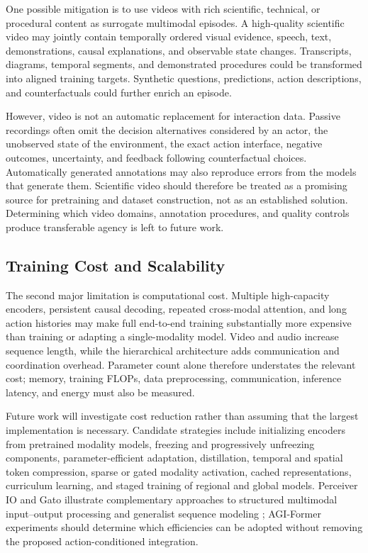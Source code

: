 One possible mitigation is to use videos with rich scientific, technical, or procedural content as surrogate multimodal episodes. A high-quality scientific video may jointly contain temporally ordered visual evidence, speech, text, demonstrations, causal explanations, and observable state changes. Transcripts, diagrams, temporal segments, and demonstrated procedures could be transformed into aligned training targets. Synthetic questions, predictions, action descriptions, and counterfactuals could further enrich an episode.

However, video is not an automatic replacement for interaction data. Passive recordings often omit the decision alternatives considered by an actor, the unobserved state of the environment, the exact action interface, negative outcomes, uncertainty, and feedback following counterfactual choices. Automatically generated annotations may also reproduce errors from the models that generate them. Scientific video should therefore be treated as a promising source for pretraining and dataset construction, not as an established solution. Determining which video domains, annotation procedures, and quality controls produce transferable agency is left to future work.

\subsection{\textbf{Training Cost and Scalability}}

The second major limitation is computational cost. Multiple high-capacity encoders, persistent causal decoding, repeated cross-modal attention, and long action histories may make full end-to-end training substantially more expensive than training or adapting a single-modality model. Video and audio increase sequence length, while the hierarchical architecture adds communication and coordination overhead. Parameter count alone therefore understates the relevant cost; memory, training FLOPs, data preprocessing, communication, inference latency, and energy must also be measured.

Future work will investigate cost reduction rather than assuming that the largest implementation is necessary. Candidate strategies include initializing encoders from pretrained modality models, freezing and progressively unfreezing components, parameter-efficient adaptation, distillation, temporal and spatial token compression, sparse or gated modality activation, cached representations, curriculum learning, and staged training of regional and global models. Perceiver IO and Gato illustrate complementary approaches to structured multimodal input--output processing and generalist sequence modeling \cite{jaegle2022perceiver,reed2022generalist}; AGI-Former experiments should determine which efficiencies can be adopted without removing the proposed action-conditioned integration.

